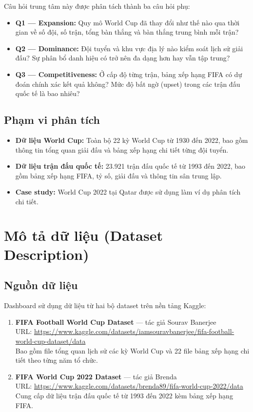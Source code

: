 \documentclass[12pt,a4paper]{article}
\begin{document}
Câu hỏi trung tâm này được phân tách thành ba câu hỏi phụ:
\begin{itemize}
    \item \textbf{Q1 --- Expansion:} Quy mô World Cup đã thay đổi như thế nào qua thời gian về số đội, số trận, tổng bàn thắng và bàn thắng trung bình mỗi trận?
    \item \textbf{Q2 --- Dominance:} Đội tuyển và khu vực địa lý nào kiểm soát lịch sử giải đấu? Sự phân bổ danh hiệu có trở nên đa dạng hơn hay vẫn tập trung?
    \item \textbf{Q3 --- Competitiveness:} Ở cấp độ từng trận, bảng xếp hạng FIFA có dự đoán chính xác kết quả không? Mức độ bất ngờ (upset) trong các trận đấu quốc tế là bao nhiêu?
\end{itemize}

\subsection{Phạm vi phân tích}
\begin{itemize}
    \item \textbf{Dữ liệu World Cup:} Toàn bộ 22 kỳ World Cup từ 1930 đến 2022, bao gồm thông tin tổng quan giải đấu và bảng xếp hạng chi tiết từng đội tuyển.
    \item \textbf{Dữ liệu trận đấu quốc tế:} 23.921 trận đấu quốc tế từ 1993 đến 2022, bao gồm bảng xếp hạng FIFA, tỷ số, giải đấu và thông tin sân trung lập.
    \item \textbf{Case study:} World Cup 2022 tại Qatar được sử dụng làm ví dụ phân tích chi tiết.
\end{itemize}


\newpage
\section{Mô tả dữ liệu (Dataset Description)}

\subsection{Nguồn dữ liệu}
Dashboard sử dụng dữ liệu từ hai bộ dataset trên nền tảng Kaggle:
\begin{enumerate}
    \item \textbf{FIFA Football World Cup Dataset} --- tác giả Sourav Banerjee \\
    URL: \url{https://www.kaggle.com/datasets/iamsouravbanerjee/fifa-football-world-cup-dataset/data} \\
    Bao gồm file tổng quan lịch sử các kỳ World Cup và 22 file bảng xếp hạng chi tiết theo từng năm tổ chức.
    \item \textbf{FIFA World Cup 2022 Dataset} --- tác giả Brenda \\
    URL: \url{https://www.kaggle.com/datasets/brenda89/fifa-world-cup-2022/data} \\
    Cung cấp dữ liệu trận đấu quốc tế từ 1993 đến 2022 kèm bảng xếp hạng FIFA.
\end{enumerate}
\end{document}
